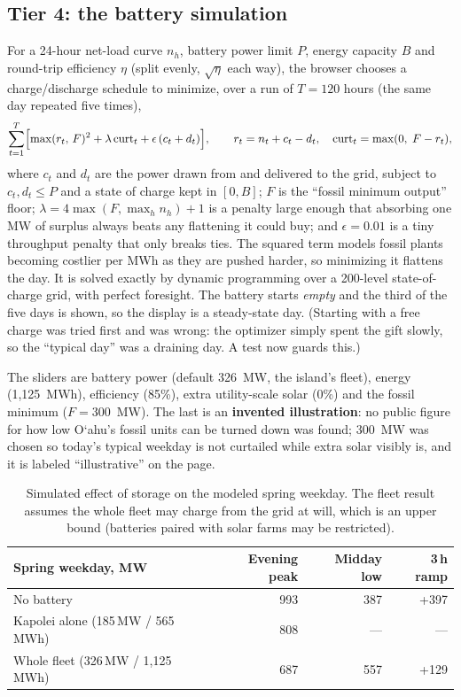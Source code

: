 \documentclass[11pt,a4paper]{article}
\newcommand{\okina}{\textquoteleft}
\newcommand{\Oahu}{\texorpdfstring{O\okina ahu}{Oahu}}
\begin{document}
\subsection{Tier 4: the battery simulation}
For a 24-hour net-load curve $n_h$, battery power limit $P$, energy capacity $B$ and round-trip efficiency $\eta$
(split evenly, $\sqrt{\eta}$ each way), the browser chooses a charge/discharge schedule to minimize, over a run of
$T=120$ hours (the same day repeated five times),
\begin{equation}
\sum_{t=1}^{T}\Bigl[\max(r_t,\,F)^{2} + \lambda\,\text{curt}_t + \epsilon\,(c_t+d_t)\Bigr],\qquad
r_t=n_t+c_t-d_t,\quad \text{curt}_t=\max(0,\;F-r_t),
\end{equation}
where $c_t$ and $d_t$ are the power drawn from and delivered to the grid, subject to $c_t,d_t\le P$ and a state of
charge kept in $[0,B]$; $F$ is the ``fossil minimum output'' floor; $\lambda = 4\max(F,\max_h n_h)+1$ is a penalty
large enough that absorbing one MW of surplus always beats any flattening it could buy; and $\epsilon=0.01$ is a
tiny throughput penalty that only breaks ties. The squared term models fossil plants becoming costlier per MWh as
they are pushed harder, so minimizing it flattens the day. It is solved exactly by dynamic programming over a
200-level state-of-charge grid, with perfect foresight. The battery starts \emph{empty} and the third of the five
days is shown, so the display is a steady-state day. (Starting with a free charge was tried first and was wrong:
the optimizer simply spent the gift slowly, so the ``typical day'' was a draining day. A test now guards this.)

The sliders are battery power (default 326~MW, the island's fleet), energy (1,125~MWh), efficiency (85\%), extra
utility-scale solar (0\%) and the fossil minimum ($F=300$~MW). The last is an \textbf{invented illustration}: no public figure
for how low \Oahu's fossil units can be turned down was found; 300~MW was chosen so today's typical weekday is not
curtailed while extra solar visibly is, and it is labeled ``illustrative'' on the page.

\begin{table}[htbp]
\centering\small\setlength{\tabcolsep}{4pt}
\begin{tabular}{@{}lrrr@{}}
\toprule
Spring weekday, MW & Evening peak & Midday low & 3\,h ramp\\
\midrule
No battery & 993 & 387 & +397\\
Kapolei alone (185\,MW / 565\,MWh) & 808 & --- & ---\\
Whole fleet (326\,MW / 1,125\,MWh) & 687 & 557 & +129\\
\bottomrule
\end{tabular}
\caption{Simulated effect of storage on the modeled spring weekday. The fleet result assumes the whole fleet
may charge from the grid at will, which is an upper bound (batteries paired with solar farms may be restricted).}
\end{table}
\end{document}
